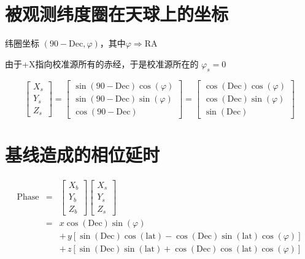 \documentclass[11pt, a4paper]{article}  %
\begin{document}
\begin{CJK}{UTF8}{gbsn}
\section{被观测纬度圈在天球上的坐标}

纬圈坐标 $(90-\text{Dec}, \varphi)$，其中$\varphi \Rightarrow \text{RA}$

由于+X指向校准源所有的赤经，于是校准源所在的 $\varphi_s=0$

\begin{equation}
	\begin{bmatrix} X_s \\ Y_s \\ Z_s \end{bmatrix}
		= \begin{bmatrix} \sin(90-\text{Dec})\cos(\varphi) \\ \sin(90-\text{Dec})\sin(\varphi) \\ \cos(90-\text{Dec}) \end{bmatrix}
		= \begin{bmatrix} \cos(\text{Dec})\cos(\varphi) \\ \cos(\text{Dec})\sin(\varphi) \\ \sin(\text{Dec}) \end{bmatrix} 
\end{equation}





\section{基线造成的相位延时}

\begin{eqnarray}
	\text{Phase} &=& \begin{bmatrix} X_b \\ Y_b \\ Z_b \end{bmatrix} \begin{bmatrix} X_s \\ Y_s \\ Z_s \end{bmatrix} \nonumber \\ 
		&=& x\cos(\text{Dec})\sin(\varphi) \nonumber \\
		&& + \, y\left[ \sin(\text{Dec})\cos(\text{lat}) - \cos(\text{Dec})\sin(\text{lat})\cos(\varphi) \right] \\
		&& + \, z\left[ \sin(\text{Dec})\sin(\text{lat}) + \cos(\text{Dec})\cos(\text{lat})\cos(\varphi) \right] \nonumber
\end{eqnarray}


\end{CJK}
\end{document}
